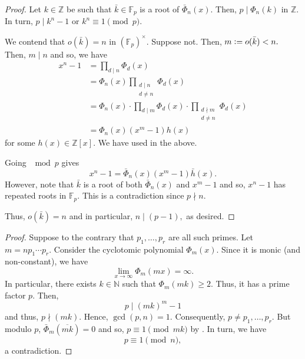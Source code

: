 \pequivonemodn*\label{lem:pequivonemodn2}
\begin{flushright}\hyperref[lem:pequivonemodn]{\upsym}\end{flushright}
\begin{proof}
    Let $k \in \mathbb{Z}$ be such that $\bar{k} \in \mathbb{F}_p$ is a root of $\bar{\Phi}_n(x).$ Then, $p \mid \Phi_n(k)$ in $\mathbb{Z}.$ In turn, $p \mid k^n - 1$ or $k^n \equiv 1 \pmod{p}.$

    We contend that $o(\bar{k}) = n$ in $(\mathbb{F}_p)^\times.$ Suppose not. Then, $m \vcentcolon= o(\bar{k}) < n.$ Then, $m \mid n$ and so, we have
    \begin{align*} 
        x^n - 1 &= \prod_{d \mid n} \Phi_d(x)\\
        &= \Phi_n(x) \prod_{\substack{d \mid n \\ d \neq n}} \Phi_d(x) \\
        &= \Phi_n(x) \cdot \prod_{d \mid m} \Phi_d(x) \cdot \prod_{\substack{d \nmid m \\ d \neq n}} \Phi_d(x)\\
        &= \Phi_n(x) (x^m - 1) h(x)
    \end{align*}
    for some $h(x) \in \mathbb{Z}[x].$ We have used  in the above.

    Going $\mod p$ gives
    \begin{equation*} 
        x^n - 1 = \bar{\Phi}_n(x) (x^m - 1) \bar{h}(x).
    \end{equation*}
    However, note that $\bar{k}$ is a root of both $\bar{\Phi}_n(x)$ and $x^m - 1$ and so, $x^n - 1$ has repeated roots in $\mathbb{F}_p.$ This is a contradiction since $p \nmid n.$

    Thus, $o(\bar{k}) = n$ and in particular, $n \mid (p - 1),$ as desired.
\end{proof}

\infprimesmodone*\label{thm:infprimesmodone2}
\begin{flushright}\hyperref[thm:infprimesmodone]{\upsym}\end{flushright}
\begin{proof}
    Suppose to the contrary that $p_1, \ldots, p_r$ are all such primes. Let $m = np_1 \cdots p_r.$ Consider the cyclotomic polynomial $\Phi_m(x).$ Since it is monic (and non-constant), we have
    \begin{equation*} 
        \lim_{x\to \infty} \Phi_m(mx) = \infty.
    \end{equation*}
    In particular, there exists $k \in \mathbb{N}$ such that $\Phi_m(mk) \ge 2.$ Thus, it has a prime factor $p.$ Then,
    \begin{equation*} 
        p \mid (mk)^m - 1
    \end{equation*}
    and thus, $p \nmid (mk).$ Hence, $\gcd(p, n) = 1.$ Consequently, $p \neq p_1, \ldots, p_r.$ But modulo $p$, $\bar{\Phi}_m(\overline{mk}) = 0$ and so, $p \equiv 1 \pmod{mk}$ by . In turn, we have
    \begin{equation*} 
        p \equiv 1 \pmod{n},
    \end{equation*}
    a contradiction.
\end{proof}

